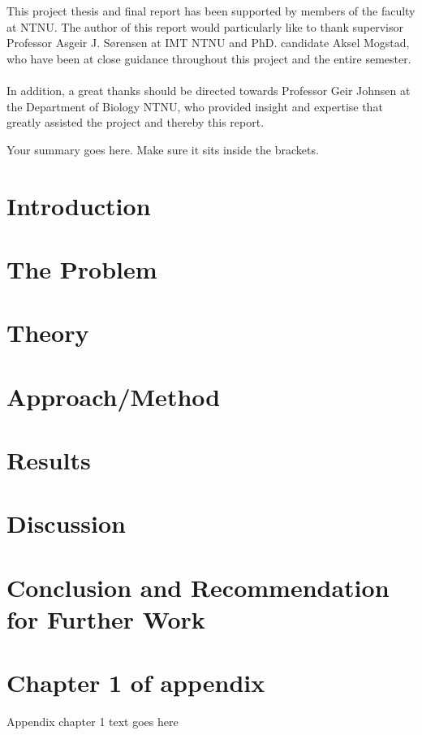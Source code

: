\documentclass[phd,tocprelim]{thesis}
\begin{document}
\begin{acknowledgements}
This project thesis and final report has been supported by members of the faculty at NTNU. The author of this report would particularly like to thank supervisor Professor Asgeir J. Sørensen at IMT NTNU and PhD. candidate Aksel Mogstad, who have been at close guidance throughout this project and the entire semester. 
\\\\
In addition, a great thanks should be directed towards Professor Geir Johnsen at the Department of Biology NTNU, who provided insight and expertise that greatly assisted the project and thereby this report.
\end{acknowledgements}

\begin{summary}
Your summary goes here. Make sure it sits inside
the brackets.
\end{summary}

\contentspage
\tablelistpage
\figurelistpage

\normalspacing \setcounter{page}{1} 
\pagestyle{thesis} \addtolength{\parskip}{0.5\baselineskip}

\chapter{Introduction}


\chapter{The Problem}


\chapter{Theory}


\chapter{{Approach/Method}}


\chapter{Results}


\chapter{Discussion}


\chapter{Conclusion and Recommendation for Further Work}



\appendix
\chapter{Chapter 1 of appendix}
Appendix chapter 1 text goes here


\end{document}
